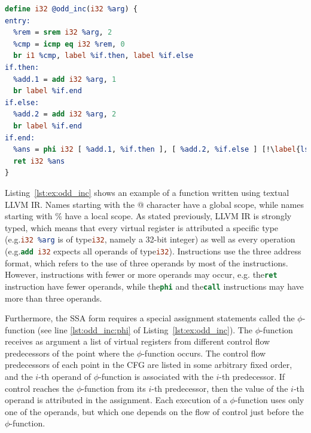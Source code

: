 \begin{lstlisting}[language=llvm,style=nasm,caption={An illustrative example of a function in textual LLVM IR. This function returns the argument incremented by one if it is even or by two if it is an odd integer.}, label={lst:ex:odd_inc}]
define i32 @odd_inc(i32 %arg) {
entry:
  %rem = srem i32 %arg, 2
  %cmp = icmp eq i32 %rem, 0
  br i1 %cmp, label %if.then, label %if.else
if.then:
  %add.1 = add i32 %arg, 1
  br label %if.end
if.else:
  %add.2 = add i32 %arg, 2
  br label %if.end
if.end:
  %ans = phi i32 [ %add.1, %if.then ], [ %add.2, %if.else ] [!\label{lst:odd_inc:phi}!]
  ret i32 %ans
}
\end{lstlisting}

Listing~\ref{lst:ex:odd_inc} shows an example of a function written using textual LLVM IR.
Names starting with the @ character have a global scope, while names starting with \% have a local scope.
As stated previously, LLVM IR is strongly typed, which means that every virtual register is attributed a specific type (e.g.\lstinline[language=llvm,style=nasm]{i32 %arg} is of type\lstinline[language=llvm,style=nasm]{i32}, namely a 32-bit integer) as well as every operation (e.g.\lstinline[language=llvm,style=nasm]{add i32} expects all operands of type\lstinline[language=llvm,style=nasm]{i32}).
Instructions use the three address format, which refers to the use of three operands by most of the instructions.
However, instructions with fewer or more operands may occur, e.g. the\lstinline[language=llvm,style=nasm]{ret} instruction have fewer operands, while the\lstinline[language=llvm,style=nasm]{phi} and the\lstinline[language=llvm,style=nasm]{call} instructions may have more than three operands.

Furthermore, the SSA form requires a special assignment statements called the $\phi$-function (see line \ref{lst:odd_inc:phi} of Listing~\ref{lst:ex:odd_inc}).
The $\phi$-function receives as argument a list of virtual registers from different  control flow predecessors of the point where the $\phi$-function occurs.
The control flow predecessors of each point in the CFG are listed in some arbitrary fixed order, and the $i$-th operand of $\phi$-function is associated with the $i$-th predecessor.
If control reaches the $\phi$-function from its $i$-th predecessor, then the value of the $i$-th operand is attributed in the assignment.
Each execution of a $\phi$-function uses only one of the operands, but which one depends on the flow of control just before the $\phi$-function.

